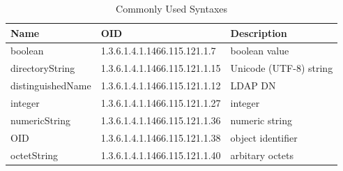 \documentclass[a4paper]{report}
\begin{document}
\begin{table}[H]
	\centering
	\caption{Commonly Used Syntaxes}
	\begin{tabular}{|l|l|l|}
		\hline
		\textbf{Name}     & \textbf{OID}                  & \textbf{Description}   \\ \hline
		boolean           & 1.3.6.1.4.1.1466.115.121.1.7  & boolean value          \\ \hline
		directoryString   & 1.3.6.1.4.1.1466.115.121.1.15 & Unicode (UTF-8) string \\ \hline
		distinguishedName & 1.3.6.1.4.1.1466.115.121.1.12 & LDAP DN                \\ \hline
		integer           & 1.3.6.1.4.1.1466.115.121.1.27 & integer                \\ \hline
		numericString     & 1.3.6.1.4.1.1466.115.121.1.36 & numeric string         \\ \hline
		OID               & 1.3.6.1.4.1.1466.115.121.1.38 & object identifier      \\ \hline
		octetString       & 1.3.6.1.4.1.1466.115.121.1.40 & arbitary octets        \\ \hline
	\end{tabular}
\end{table}
\end{document}
